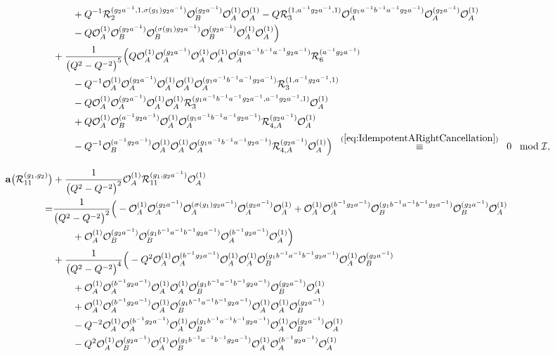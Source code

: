 \documentclass{amsart}
\newcommand{\Oa}{\mathcal O_A}
\newcommand{\Ob}{\mathcal O_B}
\newcommand{\R}{\mathcal R}
\begin{document}
\begin{align*}
&\qquad+Q^{-1}\R_{2}^{(g_2a^{-1},1,\sigma(g_1)g_2a^{-1})}\Ob^{(g_2a^{-1})}\Oa^{(1)}\Oa^{(1)}-Q\R_{3}^{(1,a^{-1}g_2a^{-1},1)}\Oa^{(g_1a^{-1}b^{-1}a^{-1}g_2a^{-1})}\Oa^{(g_2a^{-1})}\Oa^{(1)}\\
&\qquad-Q\Oa^{(1)}\Ob^{(g_2a^{-1})}\Ob^{(\sigma(g_1)g_2a^{-1})}\Ob^{(g_2a^{-1})}\Oa^{(1)}\Oa^{(1)}\Big)\\
&+\frac1{\big(Q^2-Q^{-2}\big)^5}\Big(Q\Oa^{(1)}\Oa^{(g_2a^{-1})}\Oa^{(1)}\Oa^{(1)}\Oa^{(g_1a^{-1}b^{-1}a^{-1}g_2a^{-1})}\R_{6}^{(a^{-1}g_2a^{-1})}\\
&\qquad-Q^{-1}\Oa^{(1)}\Oa^{(g_2a^{-1})}\Oa^{(1)}\Oa^{(1)}\Oa^{(g_1a^{-1}b^{-1}a^{-1}g_2a^{-1})}\R_{3}^{(1,a^{-1}g_2a^{-1},1)}\\
&\qquad-Q\Oa^{(1)}\Oa^{(g_2a^{-1})}\Oa^{(1)}\Oa^{(1)}\R_{3}^{(g_1a^{-1}b^{-1}a^{-1}g_2a^{-1},a^{-1}g_2a^{-1},1)}\Oa^{(1)}\\
&\qquad+Q\Oa^{(1)}\Ob^{(a^{-1}g_2a^{-1})}\Oa^{(1)}\Oa^{(g_1a^{-1}b^{-1}a^{-1}g_2a^{-1})}\R_{4,A}^{(g_2a^{-1})}\Oa^{(1)}\\
&\qquad-Q^{-1}\Ob^{(a^{-1}g_2a^{-1})}\Oa^{(1)}\Oa^{(1)}\Oa^{(g_1a^{-1}b^{-1}a^{-1}g_2a^{-1})}\R_{4,A}^{(g_2a^{-1})}\Oa^{(1)}\Big)\;\;\overset{(\ref{eq:IdempotentARightCancellation})}{\equiv}\;\;0\;\;\bmod\mathcal I,\\[1em]
\mathbf a\big(\R_{11}^{(g_1,g_2)}\big)&+\frac1{\big(Q^2-Q^{-2}\big)^2}\Oa^{(1)}\R_{11}^{(g_1,g_2a^{-1})}\Oa^{(1)}\\
=&\frac1{\big(Q^2-Q^{-2}\big)^2}\Big(-\Oa^{(1)}\Oa^{(g_2a^{-1})}\Oa^{(\sigma(g_1)g_2a^{-1})}\Oa^{(g_2a^{-1})}\Oa^{(1)}+\Oa^{(1)}\Oa^{(b^{-1}g_2a^{-1})}\Ob^{(g_1b^{-1}a^{-1}b^{-1}g_2a^{-1})}\Ob^{(g_2a^{-1})}\Oa^{(1)}\\
&\qquad+\Oa^{(1)}\Ob^{(g_2a^{-1})}\Ob^{(g_1b^{-1}a^{-1}b^{-1}g_2a^{-1})}\Oa^{(b^{-1}g_2a^{-1})}\Oa^{(1)}\Big)\\
&+\frac1{\big(Q^2-Q^{-2}\big)^4}\Big(-Q^2\Oa^{(1)}\Oa^{(b^{-1}g_2a^{-1})}\Oa^{(1)}\Oa^{(1)}\Ob^{(g_1b^{-1}a^{-1}b^{-1}g_2a^{-1})}\Oa^{(1)}\Ob^{(g_2a^{-1})}\\
&\qquad+\Oa^{(1)}\Oa^{(b^{-1}g_2a^{-1})}\Oa^{(1)}\Oa^{(1)}\Ob^{(g_1b^{-1}a^{-1}b^{-1}g_2a^{-1})}\Ob^{(g_2a^{-1})}\Oa^{(1)}\\
&\qquad+\Oa^{(1)}\Oa^{(b^{-1}g_2a^{-1})}\Oa^{(1)}\Ob^{(g_1b^{-1}a^{-1}b^{-1}g_2a^{-1})}\Oa^{(1)}\Oa^{(1)}\Ob^{(g_2a^{-1})}\\
&\qquad-Q^{-2}\Oa^{(1)}\Oa^{(b^{-1}g_2a^{-1})}\Oa^{(1)}\Ob^{(g_1b^{-1}a^{-1}b^{-1}g_2a^{-1})}\Oa^{(1)}\Ob^{(g_2a^{-1})}\Oa^{(1)}\\
&\qquad-Q^2\Oa^{(1)}\Ob^{(g_2a^{-1})}\Oa^{(1)}\Ob^{(g_1b^{-1}a^{-1}b^{-1}g_2a^{-1})}\Oa^{(1)}\Oa^{(b^{-1}g_2a^{-1})}\Oa^{(1)}\\

\end{align*}
\end{document}
